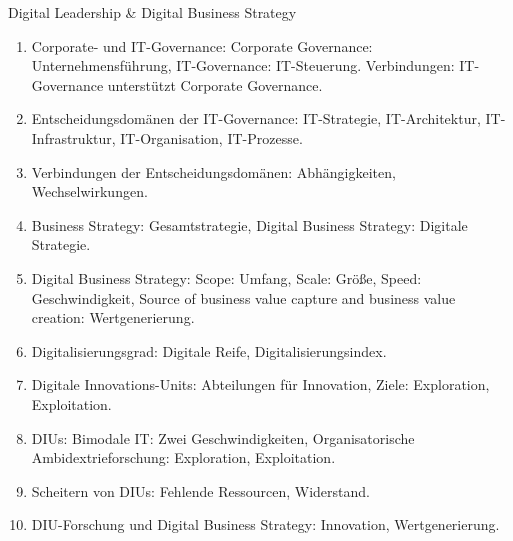\documentclass{article}
\begin{document}
\begin{exercise}{Digital Leadership \& Digital Business Strategy}
  \begin{solution}
    \begin{enumerate}
      \item Corporate- und IT-Governance: Corporate Governance: Unternehmensführung, IT-Governance: IT-Steuerung. Verbindungen: IT-Governance unterstützt Corporate Governance.
      \item Entscheidungsdomänen der IT-Governance: IT-Strategie, IT-Architektur, IT-Infrastruktur, IT-Organisation, IT-Prozesse.
      \item Verbindungen der Entscheidungsdomänen: Abhängigkeiten, Wechselwirkungen.
      \item Business Strategy: Gesamtstrategie, Digital Business Strategy: Digitale Strategie.
      \item Digital Business Strategy: Scope: Umfang, Scale: Größe, Speed: Geschwindigkeit, Source of business value capture and business value creation: Wertgenerierung.
      \item Digitalisierungsgrad: Digitale Reife, Digitalisierungsindex.
      \item Digitale Innovations-Units: Abteilungen für Innovation, Ziele: Exploration, Exploitation.
      \item DIUs: Bimodale IT: Zwei Geschwindigkeiten, Organisatorische Ambidextrieforschung: Exploration, Exploitation.
      \item Scheitern von DIUs: Fehlende Ressourcen, Widerstand.
      \item DIU-Forschung und Digital Business Strategy: Innovation, Wertgenerierung.
    \end{enumerate}
  \end{solution}
\end{exercise}
\end{document}
